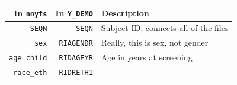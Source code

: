\documentclass[
]{book}
\begin{document}
\begin{longtable}[]{@{}rrl@{}}
\toprule
\begin{minipage}[b]{0.20\columnwidth}\raggedleft
In \texttt{nnyfs}\strut
\end{minipage} & \begin{minipage}[b]{0.16\columnwidth}\raggedleft
In \texttt{Y\_DEMO}\strut
\end{minipage} & \begin{minipage}[b]{0.56\columnwidth}\raggedright
Description\strut
\end{minipage}\tabularnewline
\midrule
\endhead
\begin{minipage}[t]{0.20\columnwidth}\raggedleft
\texttt{SEQN}\strut
\end{minipage} & \begin{minipage}[t]{0.16\columnwidth}\raggedleft
\texttt{SEQN}\strut
\end{minipage} & \begin{minipage}[t]{0.56\columnwidth}\raggedright
Subject ID, connects all of the files\strut
\end{minipage}\tabularnewline
\begin{minipage}[t]{0.20\columnwidth}\raggedleft
\texttt{sex}\strut
\end{minipage} & \begin{minipage}[t]{0.16\columnwidth}\raggedleft
\texttt{RIAGENDR}\strut
\end{minipage} & \begin{minipage}[t]{0.56\columnwidth}\raggedright
Really, this is sex, not gender\strut
\end{minipage}\tabularnewline
\begin{minipage}[t]{0.20\columnwidth}\raggedleft
\texttt{age\_child}\strut
\end{minipage} & \begin{minipage}[t]{0.16\columnwidth}\raggedleft
\texttt{RIDAGEYR}\strut
\end{minipage} & \begin{minipage}[t]{0.56\columnwidth}\raggedright
Age in years at screening\strut
\end{minipage}\tabularnewline
\begin{minipage}[t]{0.20\columnwidth}\raggedleft
\texttt{race\_eth}\strut
\end{minipage} & \begin{minipage}[t]{0.16\columnwidth}\raggedleft
\texttt{RIDRETH1}\strut
\end{minipage} & \begin{minipage}[t]{0.56\columnwidth}\raggedright

\end{minipage}
\end{longtable}
\end{document}
